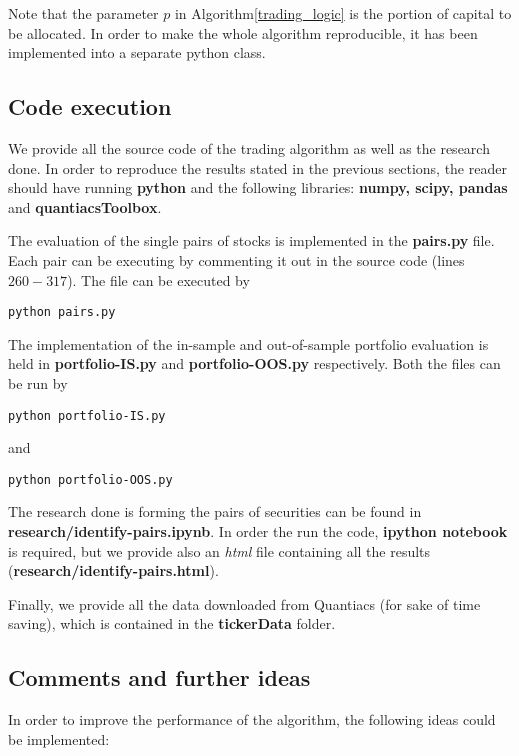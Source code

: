 \documentclass{paper}
\begin{document}
Note that the parameter $p$ in Algorithm\ref{trading_logic} is the portion of capital to be allocated. In order to make the whole algorithm reproducible, it has been implemented into a separate python class.

\subsection{Code execution}

We provide all the source code of the trading algorithm as well as the research done. In order to reproduce the results stated in the previous sections, the reader should have running \textbf{python} and the following libraries: \textbf{numpy, scipy, pandas} and \textbf{quantiacsToolbox}.

The evaluation of the single pairs of stocks is implemented in the \textbf{pairs.py} file. Each pair can be executing by commenting it out in the source code (lines $260-317$). The file can be executed by
\begin{lstlisting}
python pairs.py
\end{lstlisting}

The implementation of the in-sample and out-of-sample portfolio evaluation is held in \textbf{portfolio-IS.py} and \textbf{portfolio-OOS.py} respectively. Both the files can be run by 

\begin{lstlisting}
python portfolio-IS.py
\end{lstlisting}
and 
\begin{lstlisting}
python portfolio-OOS.py
\end{lstlisting}

The research done is forming the pairs of securities can be found in \textbf{research/identify-pairs.ipynb}. In order the run the code, \textbf{ipython notebook} is required, but we provide also an \textit{html} file containing all the results (\textbf{research/identify-pairs.html}).

Finally, we provide all the data downloaded from Quantiacs (for sake of time saving), which is contained in the \textbf{tickerData} folder.


\subsection{Comments and further ideas}

In order to improve the performance of the algorithm, the following ideas could be implemented:
\end{document}
